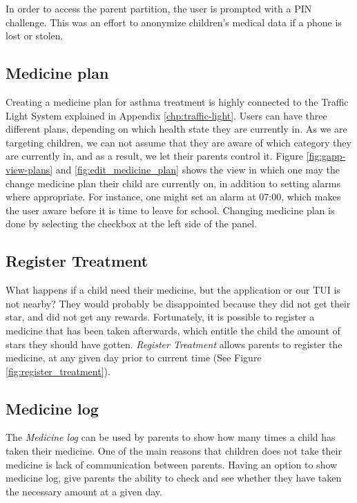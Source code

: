 In order to access the parent partition, the user is prompted with a PIN challenge. This was an effort to anonymize children's medical data if a phone is lost or stolen. 

\subsection{Medicine plan}
\label{sec:description-medicine-plan}
Creating a medicine plan for asthma treatment is highly connected to the Traffic Light System explained in Appendix \ref{chp:traffic-light}.
Users can have three different plans, depending on which health state they are currently in. As we are targeting children, we can not assume that they are aware of which category they are currently in, and as a result, we let their parents control it. Figure \ref{fig:gapp-view-plans} and \ref{fig:edit_medicine_plan} shows the view in which one may the change medicine plan their child are currently on, in addition to setting alarms where appropriate. For instance, one might set an alarm at 07:00, which makes the user aware before it is time to leave for school. Changing medicine plan is done by selecting the checkbox at the left side of the panel.  


\subsection{Register Treatment}
\label{sec:description-register-medicine}
What happens if a child need their medicine, but the application or our TUI is not nearby? They would probably be disappointed because they did not get their star, and did not get any rewards. Fortunately, it is possible to register a medicine that has been taken afterwards, which entitle the child the amount of stars they should have gotten. \emph{Register Treatment} allows parents to register the medicine, at any given day prior to current time (See Figure \ref{fig:register_treatment}).  


\subsection{Medicine log}
\label{sec:description-medicine-log}
The \emph{Medicine log} can be used by parents to show how many times a child has taken their medicine. One of the main reasons that children does not take their medicine is lack of communication between parents. Having an option to show medicine log, give parents the ability to check and see whether they have taken the necessary amount at a given day.

